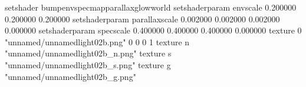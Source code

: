setshader bumpenvspecmapparallaxglowworld
setshaderparam envscale 0.200000 0.200000 0.200000
setshaderparam parallaxscale 0.002000 0.002000 0.002000 0.000000
setshaderparam specscale 0.400000 0.400000 0.400000 0.000000
texture 0 "unnamed/unnamedlight02b.png" 0 0 0 1
texture n "unnamed/unnamedlight02b_n.png"
texture s "unnamed/unnamedlight02b_s.png"
texture g "unnamed/unnamedlight02b_g.png"